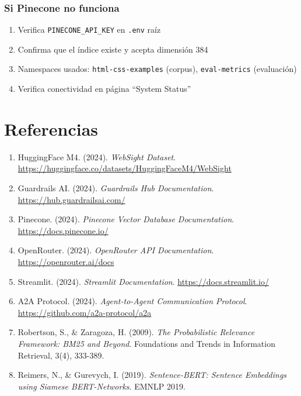 \documentclass[12pt,a4paper]{article}
\begin{document}
\subsubsection{Si Pinecone no funciona}

\begin{enumerate}
    \item Verifica \texttt{PINECONE\_API\_KEY} en \texttt{.env} raíz
    \item Confirma que el índice existe y acepta dimensión 384
    \item Namespaces usados: \texttt{html-css-examples} (corpus), \texttt{eval-metrics} (evaluación)
    \item Verifica conectividad en página ``System Status''
\end{enumerate}

\section{Referencias}

\begin{enumerate}
    \item HuggingFace M4. (2024). \textit{WebSight Dataset}. \url{https://huggingface.co/datasets/HuggingFaceM4/WebSight}
    
    \item Guardrails AI. (2024). \textit{Guardrails Hub Documentation}. \url{https://hub.guardrailsai.com/}
    
    \item Pinecone. (2024). \textit{Pinecone Vector Database Documentation}. \url{https://docs.pinecone.io/}
    
    \item OpenRouter. (2024). \textit{OpenRouter API Documentation}. \url{https://openrouter.ai/docs}
    
    \item Streamlit. (2024). \textit{Streamlit Documentation}. \url{https://docs.streamlit.io/}
    
    \item A2A Protocol. (2024). \textit{Agent-to-Agent Communication Protocol}. \url{https://github.com/a2a-protocol/a2a}
    
    \item Robertson, S., \& Zaragoza, H. (2009). \textit{The Probabilistic Relevance Framework: BM25 and Beyond}. Foundations and Trends in Information Retrieval, 3(4), 333-389.
    
    \item Reimers, N., \& Gurevych, I. (2019). \textit{Sentence-BERT: Sentence Embeddings using Siamese BERT-Networks}. EMNLP 2019.
\end{enumerate}
\end{document}
